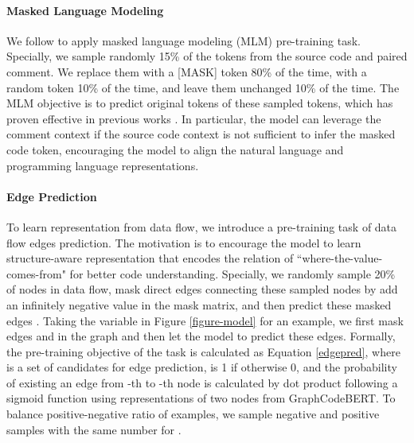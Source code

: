 \documentclass{article} \usepackage{iclr2021_conference,times}
\begin{document}
\paragraph{Masked Language Modeling}
We follow \citet{devlin2018bert} to apply masked language modeling (MLM) pre-training task. Specially, we sample randomly 15\% of the tokens from the source code and paired comment. We replace them with a [MASK] token 80\% of the time, with a random token 10\% of the time, and leave them unchanged 10\% of the time.  The MLM objective is to predict original tokens of these sampled tokens, which has proven effective in previous works \citep{devlin2018bert,liu2019roberta,feng2020codebert}.
In particular, the model can leverage the comment context if the source code context is not sufficient to infer the masked code token, encouraging the model to align the natural language  and programming language representations.


\paragraph{Edge Prediction}
To learn representation from data flow, we introduce a pre-training task of data flow edges prediction. The motivation is to encourage the model to learn structure-aware representation that encodes the relation of ``where-the-value-comes-from" for better code understanding. Specially, we randomly sample 20\% of nodes  in data flow, mask direct edges connecting these sampled nodes by add an infinitely negative value in the mask matrix, and then predict these masked edges . Taking the variable  in Figure \ref{figure-model} for an example, we first mask edges  and  in the graph and then let the model to predict these edges.  Formally, the pre-training objective of the task is calculated as Equation \ref{edgepred}, where  is a set of candidates for edge prediction,  is 1 if  otherwise 0, and the probability  of existing an edge from -th to -th node is calculated by dot product following a sigmoid function using representations of two nodes from GraphCodeBERT. To balance positive-negative ratio of examples, we sample negative and positive samples with the same number for .
\end{document}
